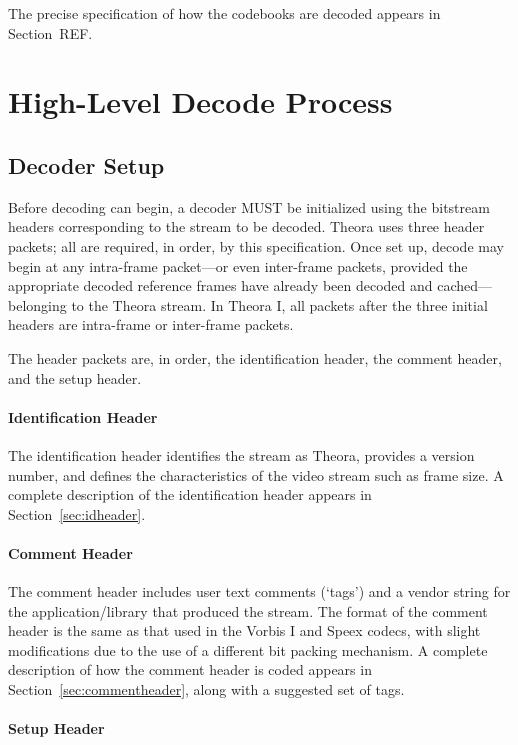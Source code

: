 \documentclass[11pt,letterpaper]{book}
\numberwithin{equation}{chapter}
\numberwithin{figure}{chapter}
\numberwithin{table}{chapter}
\begin{document}
The precise specification of how the codebooks are decoded appears in
 Section~REF.

\section{High-Level Decode Process}

\subsection{Decoder Setup}

Before decoding can begin, a decoder MUST be initialized using the bitstream
 headers corresponding to the stream to be decoded.
Theora uses three header packets; all are required, in order, by this
 specification.
Once set up, decode may begin at any intra-frame packet---or even inter-frame
 packets, provided the appropriate decoded reference frames have already been
 decoded and cached---belonging to the Theora stream.
In Theora I, all packets after the three initial headers are intra-frame or
 inter-frame packets.

The header packets are, in order, the identification header, the comment
 header, and the setup header.

\paragraph{Identification Header}

The identification header identifies the stream as Theora, provides a version
 number, and defines the characteristics of the video stream such as frame
 size.
A complete description of the identification header appears in
 Section~\ref{sec:idheader}.

\paragraph{Comment Header}

The comment header includes user text comments (`tags') and a vendor string
 for the application/library that produced the stream.
The format of the comment header is the same as that used in the Vorbis I and
 Speex codecs, with slight modifications due to the use of a different bit
 packing mechanism.
A complete description of how the comment header is coded appears in
 Section~\ref{sec:commentheader}, along with a suggested set of tags.

\paragraph{Setup Header}
\end{document}
